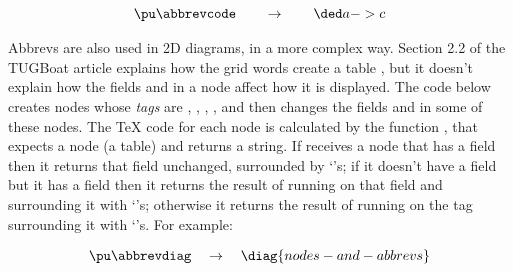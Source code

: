 \documentclass[oneside]{article}
\begin{document}

$$\pu
  \myvcenter{\abbrevcode}
  \qquad
  \to
  \qquad
  \cded{a->c}
$$


Abbrevs are also used in 2D diagrams, in a more complex way. Section
2.2 of the TUGBoat article explains how the grid words create a table
, but it doesn't explain how the fields  and
 in a node affect how it is displayed. The code below creates
nodes whose {\sl tags} are , , , , and
then changes the fields  and  in some of these
nodes. The \TeX{} code for each node is calculated by the function
, that expects a node (a table) and returns a
string. If  receives a node that has a 
field then it returns that field unchanged, surrounded by
`\co{\{\}}'s; if it doesn't have a  field but it has a
 field then it returns the result of running  on
that field and surrounding it with `\co{\{\}}'s; otherwise it returns
the result of running  on the tag surrounding it with
`\co{\{\}}'s. For example:


$$\pu
  \myvcenter{\abbrevdiag}
  \quad
  \to
  \quad
  \diag{nodes-and-abbrevs}
$$
\end{document}
